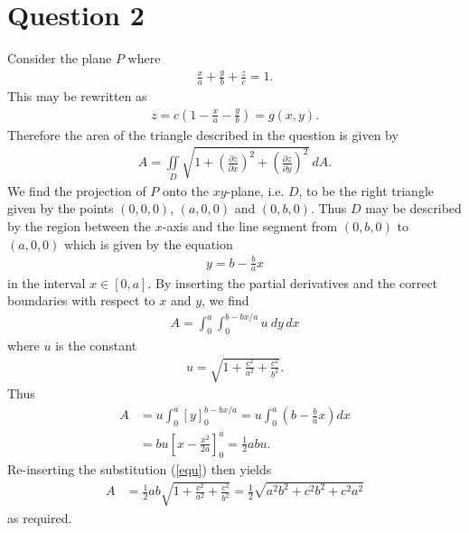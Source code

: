 \documentclass{article}
\newcommand{\di}{\iint\limits}
\begin{document}
\section*{Question 2}
Consider the plane $P$ where
\begin{align*}
  \frac{x}{a}+\frac{y}{b}+\frac{z}{c}=1.
\end{align*}
This may be rewritten as
\begin{align*}
  z=c\left(1-\frac{x}{a}-\frac{y}{b}\right)=g(x,y).
\end{align*}
Therefore the area of the triangle described in the question is given by
\begin{align*}
  A = \di_D \sqrt{1 + \left(\frac{\partial z}{\partial x}\right)^2+\left(\frac{\partial z}{\partial y}\right)^2}\:dA.
\end{align*}
We find the projection of $P$ onto the $xy$-plane, i.e. $D$, to be the right triangle
given by the points $(0,0,0)$, $(a,0,0)$ and $(0,b,0)$.
Thus $D$ may be described by the region between the $x$-axis and the line segment from $(0,b,0)$ to
$(a,0,0)$ which is given by the equation
\begin{align*}
  y = b-\frac{b}{a}x
\end{align*}
in the interval $x\in[0,a]$.
By inserting the partial derivatives and the correct boundaries with respect to
$x$ and $y$, we find
\begin{align*}
  A = \int_0^a \int_0^{b-bx/a}u\:dy\,dx
\end{align*}
where $u$ is the constant
\begin{align}
  \label{equ}
  u = \sqrt{1+\frac{c^2}{a^2}+\frac{c^2}{b^2}}.
\end{align}
Thus 
\begin{align*}
  A &= u\int_0^a [y]_0^{b-bx/a}=u\int_0^a\left(b - \frac{b}{a}x\right)dx\\
  &= bu \left[x-\frac{x^2}{2a}\right]_0^a = \frac{1}{2}abu.
\end{align*}
Re-inserting the substitution (\ref{equ}) then yields
\begin{align*}
  A &= \frac{1}{2}ab\sqrt{1+\frac{c^2}{a^2}+\frac{c^2}{b^2}}
  = \frac{1}{2}\sqrt{a^2b^2+c^2b^2+c^2a^2}
\end{align*}
as required.
\end{document}
